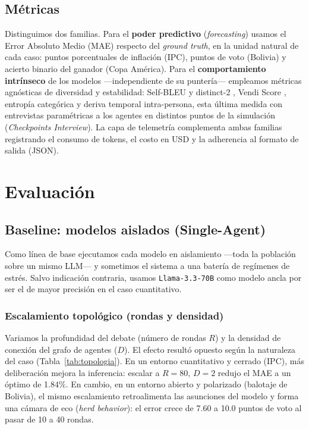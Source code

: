 \documentclass[11pt]{article}
\begin{document}
\subsection{Métricas}

Distinguimos dos familias. Para el \textbf{poder predictivo} (\textit{forecasting}) usamos el Error Absoluto Medio (MAE) respecto del \textit{ground truth}, en la unidad natural de cada caso: puntos porcentuales de inflación (IPC), puntos de voto (Bolivia) y acierto binario del ganador (Copa América). Para el \textbf{comportamiento intrínseco} de los modelos —independiente de su puntería— empleamos métricas agnósticas de diversidad y estabilidad: Self-BLEU y distinct-2 \citep{li2016diversity,zhu2018texygen}, Vendi Score \citep{friedman2023vendi}, entropía categórica y deriva temporal intra-persona, esta última medida con entrevistas paramétricas a los agentes en distintos puntos de la simulación (\textit{Checkpoints Interview}). La capa de telemetría complementa ambas familias registrando el consumo de tokens, el costo en USD y la adherencia al formato de salida (JSON).

\section{Evaluación}
\label{sec:evaluacion}

\subsection{Baseline: modelos aislados (Single-Agent)}
\label{subsec:baseline}

Como línea de base ejecutamos cada modelo en aislamiento —toda la población sobre un mismo LLM— y sometimos el sistema a una batería de regímenes de estrés. Salvo indicación contraria, usamos \texttt{Llama-3.3-70B} como modelo ancla por ser el de mayor precisión en el caso cuantitativo.

\subsubsection{Escalamiento topológico (rondas y densidad)}

Variamos la profundidad del debate (número de rondas $R$) y la densidad de conexión del grafo de agentes ($D$). El efecto resultó opuesto según la naturaleza del caso (Tabla~\ref{tab:topologia}). En un entorno cuantitativo y cerrado (IPC), más deliberación mejora la inferencia: escalar a $R=80$, $D=2$ redujo el MAE a un óptimo de 1.84\%. En cambio, en un entorno abierto y polarizado (balotaje de Bolivia), el mismo escalamiento retroalimenta las asunciones del modelo y forma una cámara de eco (\textit{herd behavior}): el error crece de 7.60 a 10.0 puntos de voto al pasar de 10 a 40 rondas.
\end{document}
